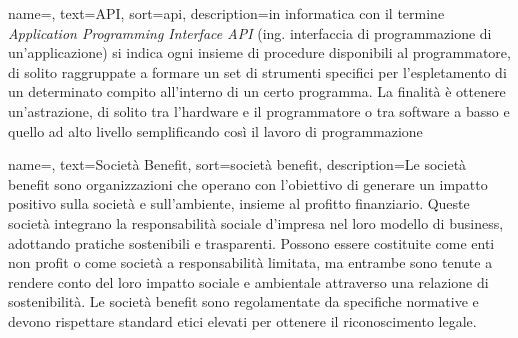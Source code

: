 
 {
    name=,
    text=API,
    sort=api,
    description={in informatica con il termine \emph{Application Programming Interface API} (ing. interfaccia di programmazione di un'applicazione) si indica ogni insieme di procedure disponibili al programmatore, di solito raggruppate a formare un set di strumenti specifici per l'espletamento di un determinato compito all'interno di un certo programma. La finalità è ottenere un'astrazione, di solito tra l'hardware e il programmatore o tra software a basso e quello ad alto livello semplificando così il lavoro di programmazione}
}

 {
    name=,
    text=Società Benefit,
    sort=società benefit,
    description={Le società benefit sono organizzazioni che operano con l'obiettivo di generare un impatto positivo sulla società e sull'ambiente, insieme al profitto finanziario. Queste società integrano la responsabilità sociale d'impresa nel loro modello di business, adottando pratiche sostenibili e trasparenti. Possono essere costituite come enti non profit o come società a responsabilità limitata, ma entrambe sono tenute a rendere conto del loro impatto sociale e ambientale attraverso una relazione di sostenibilità. Le società benefit sono regolamentate da specifiche normative e devono rispettare standard etici elevati per ottenere il riconoscimento legale.}
}


